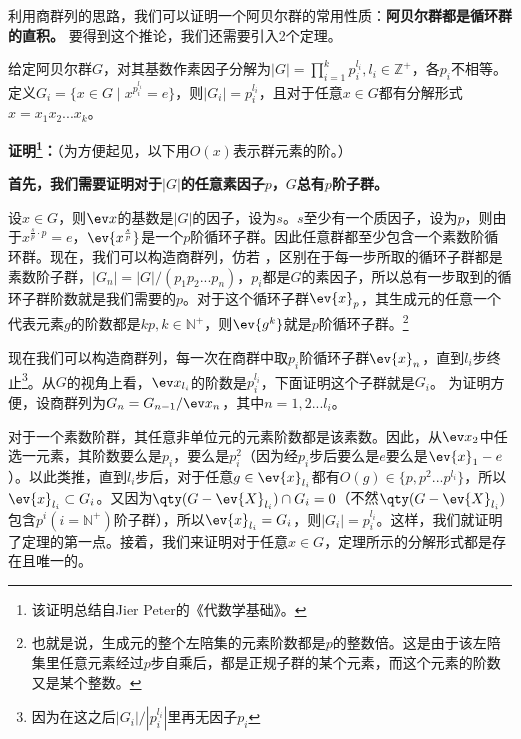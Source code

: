 

利用商群列的思路，我们可以证明一个阿贝尔群的常用性质：\textbf{阿贝尔群都是循环群的直积。
}要得到这个推论，我们还需要引入2个定理。
\begin{theorem}{}
给定阿贝尔群$G$，对其基数作素因子分解为$|G|=\prod_{i=1}^{k} p_{i}^{l_{i}},l_i\in\mathbb{Z}^+$，各$p_i$不相等。
定义$G_i = \{x \in G \mid x^{p_i^{l_i}} = e\}$，则$|G_i|=p_i^{l_i}$，且对于任意$x\in G$都有分解形式$x=x_1x_2...x_k$。
\end{theorem}
\textbf{证明\footnote{该证明总结自Jier Peter的《代数学基础》。}：}（为方便起见，以下用$O(x)$表示群元素的阶。）

\textbf{首先，我们需要证明对于$|G|$的任意素因子$p$，$G$总有$p$阶子群。}

设$x\in G$，则$\ev x$的基数是$|G|$的因子，设为$s$。$s$至少有一个质因子，设为$p$，则由于$x^{\frac{s}{p}\cdot p}=e$，$\ev {x^{\frac{s}{p}}}$是一个$p$阶循环子群。因此任意群都至少包含一个素数阶循环群。现在，我们可以构造商群列，仿若    ，区别在于每一步所取的循环子群都是素数阶子群，$|G_n|=|G|/(p_1p_2...p_n)$，$p_i$都是$G$的素因子，所以总有一步取到的循环子群阶数就是我们需要的$p$。对于这个循环子群$\ev {x}_p$，其生成元的任意一个代表元素$g$的阶数都是$kp,k\in \mathbb N^{+}$，则$\ev{g^k}$就是$p$阶循环子群。\footnote{也就是说，生成元的整个左陪集的元素阶数都是$p$的整数倍。这是由于该左陪集里任意元素经过$p$步自乘后，都是正规子群的某个元素，而这个元素的阶数又是某个整数。}

现在我们可以构造商群列，每一次在商群中取$p_i$阶循环子群$\ev{x}_{n}$，直到$l_i$步终止\footnote{因为在这之后$|G_i|/|p_i^{l_i}|$里再无因子$p_i$}。从$G$的视角上看，$\ev x_{l_i}$的阶数是$p_i^{l_i}$，下面证明这个子群就是$G_i$。
为证明方便，设商群列为$G_n=G_{n-1}/\ev x_n$，其中$ n=1,2...l_i$。

对于一个素数阶群，其任意非单位元的元素阶数都是该素数。因此，从$\ev x_2$中任选一元素，其阶数要么是$p_i$，要么是$p_i^2$（因为经$p_i$步后要么是$e$要么是$\ev{x}_1-e$）。以此类推，直到$l_i$步后，对于任意$g\in\ev{x}_{l_i}$都有$O(g)\in\{p,p^2...p^{l_i}\}$，所以$\ev{x}_{l_i}\subset G_i$。又因为$\qty (G-\ev{X}_{l_i})\cap G_i=0$（不然$\qty (G-\ev{X}_{l_i})$包含$p^i(i=\mathbb N^{+})$阶子群），所以$\ev{x}_{l_i}=G_i$，则$|G_i|=p_i^{l_i}$。这样，我们就证明了定理的第一点。接着，我们来证明对于任意$x\in G$，定理所示的分解形式都是存在且唯一的。

